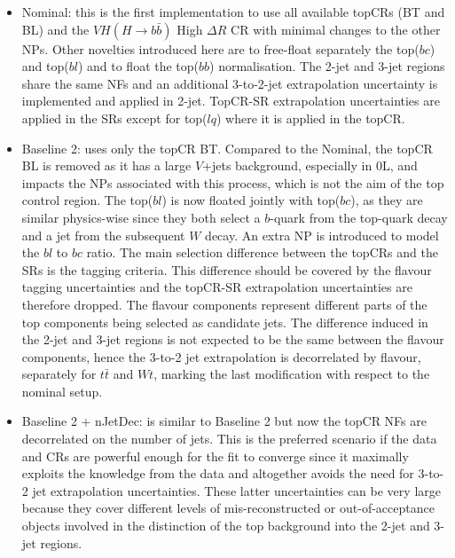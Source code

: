 \begin{itemize}
\item Nominal: this is the first implementation to use all available topCRs (BT and BL) and the $VH(H\rightarrow b\bar{b})$ High $\Delta R$ CR with minimal changes to the other NPs. Other novelties introduced here are to free-float separately the top($bc$) and top($bl$) and to float the top($bb$) normalisation. The 2-jet and 3-jet regions share the same NFs and an additional 3-to-2-jet extrapolation uncertainty is implemented and applied in 2-jet. TopCR-SR extrapolation uncertainties are applied in the SRs except for top($lq$) where it is applied in the topCR. 
\item Baseline 2: uses only the topCR BT. Compared to the Nominal, the topCR BL is removed as it has a large $V$+jets background, especially in 0L, and impacts the NPs associated with this process, which is not the aim of the top control region. The top($bl$) is now floated jointly with top($bc$), as they are similar physics-wise since they both select a $b$-quark from the top-quark decay and a jet from the subsequent $W$ decay. An extra NP is introduced to model the $bl$ to $bc$ ratio. The main selection difference between the topCRs and the SRs is the tagging criteria. This difference should be covered by the flavour tagging uncertainties and the topCR-SR extrapolation uncertainties are therefore dropped. The flavour components represent different parts of the top components being selected as candidate jets. The difference induced in the 2-jet and 3-jet regions is not expected to be the same between the flavour components, hence the 3-to-2 jet extrapolation is decorrelated by flavour, separately for $t\bar{t}$ and $Wt$, marking the last modification with respect to the nominal setup.
\item Baseline 2 + nJetDec: is similar to Baseline 2 but now the topCR NFs are decorrelated on the number of jets. This is the preferred scenario if the data and CRs are powerful enough for the fit to converge since it maximally exploits the knowledge from the data and altogether avoids the need for 3-to-2 jet extrapolation uncertainties. These latter uncertainties can be very large because they cover different levels of mis-reconstructed or out-of-acceptance objects involved in the distinction of the top background into the 2-jet and 3-jet regions.
\end{itemize}

